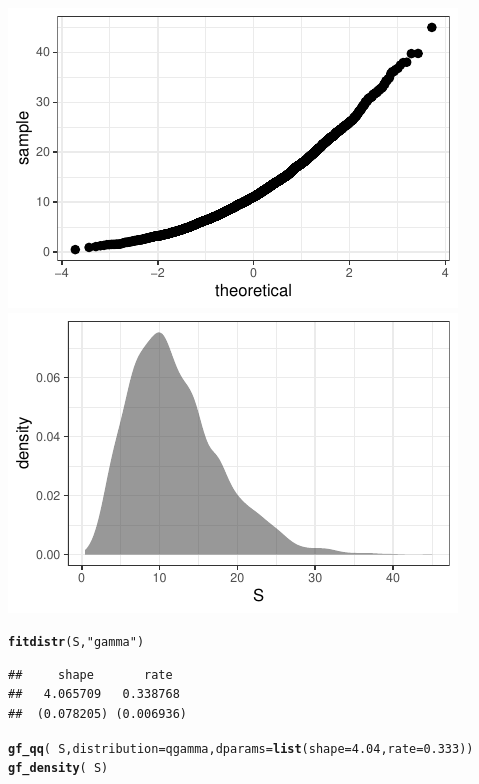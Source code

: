 \documentclass[twoside]{book}\usepackage[]{graphicx}\usepackage[]{xcolor}
\makeatletter
\def\maxwidth{ %
  \ifdim\Gin@nat@width>\linewidth
    \linewidth
  \else
    \Gin@nat@width
  \fi
}
\newcommand{\hlnum}[1]{\textcolor[rgb]{0.686,0.059,0.569}{#1}}%
\newcommand{\hlstr}[1]{\textcolor[rgb]{0.192,0.494,0.8}{#1}}%
\newcommand{\hlopt}[1]{\textcolor[rgb]{0,0,0}{#1}}%
\newcommand{\hlstd}[1]{\textcolor[rgb]{0.345,0.345,0.345}{#1}}%
\newcommand{\hlkwc}[1]{\textcolor[rgb]{0.333,0.667,0.333}{#1}}%
\newcommand{\hlkwd}[1]{\textcolor[rgb]{0.737,0.353,0.396}{\textbf{#1}}}%
\newenvironment{kframe}{%
 \def\at@end@of@kframe{}%
 \ifinner\ifhmode%
  \def\at@end@of@kframe{\end{minipage}}%
  \begin{minipage}{\columnwidth}%
 \fi\fi%
 \def\FrameCommand##1{\hskip\@totalleftmargin \hskip-\fboxsep
 \colorbox{shadecolor}{##1}\hskip-\fboxsep
     \hskip-\linewidth \hskip-\@totalleftmargin \hskip\columnwidth}%
 \MakeFramed {\advance\hsize-\width
   \@totalleftmargin\z@ \linewidth\hsize
   \@setminipage}}%
 {\par\unskip\endMakeFramed%
 \at@end@of@kframe}
\newenvironment{knitrout}{}{} %
\makeatother
\begin{document}
\begin{solution}
\begin{knitrout}
{\centering \includegraphics[width=\maxwidth]{figures/fig-unnamed-chunk-145-1} 
\includegraphics[width=\maxwidth]{figures/fig-unnamed-chunk-145-2} 

}



\end{knitrout}
\begin{knitrout}
\color{fgcolor}\begin{kframe}
\begin{alltt}
\hlkwd{fitdistr}\hlstd{(S,} \hlstr{"gamma"}\hlstd{)}
\end{alltt}
\begin{verbatim}
##     shape       rate  
##   4.065709   0.338768 
##  (0.078205) (0.006936)
\end{verbatim}
\begin{alltt}
\hlkwd{gf_qq}\hlstd{(} \hlopt{~} \hlstd{S,} \hlkwc{distribution} \hlstd{= qgamma,} \hlkwc{dparams} \hlstd{=} \hlkwd{list}\hlstd{(}\hlkwc{shape} \hlstd{=} \hlnum{4.04}\hlstd{,} \hlkwc{rate} \hlstd{=} \hlnum{0.333}\hlstd{))}
\hlkwd{gf_density}\hlstd{(} \hlopt{~} \hlstd{S)}
\end{alltt}
\end{kframe}


\end{knitrout}
\end{solution}
\end{document}
